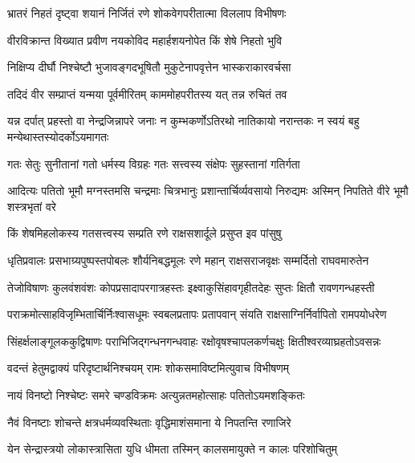 
\twolineshloka
{भ्रातरं निहतं दृष्ट्वा शयानं निर्जितं रणे}
{शोकवेगपरीतात्मा विललाप विभीषणः} %

\twolineshloka
{वीरविक्रान्त विख्यात प्रवीण नयकोविद}
{महार्हशयनोपेत किं शेषे निहतो भुवि} %

\twolineshloka
{निक्षिप्य दीर्घौ निश्चेष्टौ भुजावङ्गदभूषितौ}
{मुकुटेनापवृत्तेन भास्कराकारवर्चसा} %

\twolineshloka
{तदिदं वीर सम्प्राप्तं यन्मया पूर्वमीरितम्}
{काममोहपरीतस्य यत् तन्न रुचितं तव} %

\threelineshloka
{यन्न दर्पात् प्रहस्तो वा नेन्द्रजिन्नापरे जनाः}
{न कुम्भकर्णोऽतिरथो नातिकायो नरान्तकः}
{न स्वयं बहु मन्येथास्तस्योदर्कोऽयमागतः} %

\twolineshloka
{गतः सेतुः सुनीतानां गतो धर्मस्य विग्रहः}
{गतः सत्त्वस्य संक्षेपः सुहस्तानां गतिर्गता} %

\threelineshloka
{आदित्यः पतितो भूमौ मग्नस्तमसि चन्द्रमाः}
{चित्रभानुः प्रशान्तार्चिर्व्यवसायो निरुद्यमः}
{अस्मिन् निपतिते वीरे भूमौ शस्त्रभृतां वरे} %

\twolineshloka
{किं शेषमिहलोकस्य गतसत्त्वस्य सम्प्रति}
{रणे राक्षसशार्दूले प्रसुप्त इव पांसुषु} %

\twolineshloka
{धृतिप्रवालः प्रसभाग्र्यपुष्पस्तपोबलः शौर्यनिबद्धमूलः}
{रणे महान् राक्षसराजवृक्षः सम्मर्दितो राघवमारुतेन} %

\twolineshloka
{तेजोविषाणः कुलवंशवंशः कोपप्रसादापरगात्रहस्तः}
{इक्ष्वाकुसिंहावगृहीतदेहः सुप्तः क्षितौ रावणगन्धहस्ती} %

\twolineshloka
{पराक्रमोत्साहविजृम्भितार्चिर्निःश्वासधूमः स्वबलप्रतापः}
{प्रतापवान् संयति राक्षसाग्निर्निर्वापितो रामपयोधरेण} %

\twolineshloka
{सिंहर्क्षलाङ्गूलककुद्विषाणः पराभिजिद्गन्धनगन्धवाहः}
{रक्षोवृषश्चापलकर्णचक्षुः क्षितीश्वरव्याघ्रहतोऽवसन्नः} %

\twolineshloka
{वदन्तं हेतुमद्वाक्यं परिदृष्टार्थनिश्चयम्}
{रामः शोकसमाविष्टमित्युवाच विभीषणम्} %

\twolineshloka
{नायं विनष्टो निश्चेष्टः समरे चण्डविक्रमः}
{अत्युन्नतमहोत्साहः पतितोऽयमशङ्कितः} %

\twolineshloka
{नैवं विनष्टाः शोचन्ते क्षत्रधर्मव्यवस्थिताः}
{वृद्धिमाशंसमाना ये निपतन्ति रणाजिरे} %

\twolineshloka
{येन सेन्द्रास्त्रयो लोकास्त्रासिता युधि धीमता}
{तस्मिन् कालसमायुक्ते न कालः परिशोचितुम्} %

